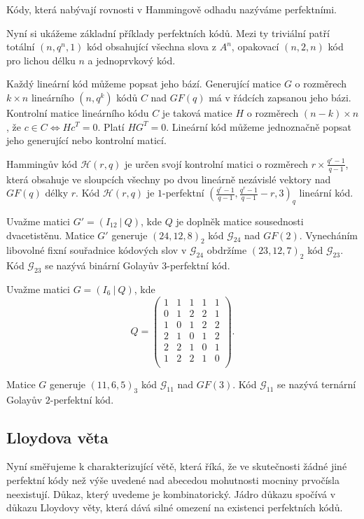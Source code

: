\df Kódy, která nabývají rovnosti v Hammingově odhadu nazýváme perfektními.

Nyní si ukážeme základní příklady perfektních kódů. Mezi ty triviální patří totální $(n, q^n, 1)$ kód obsahující všechna slova z $A^n$, opakovací $(n, 2, n )$ kód pro lichou délku $n$ a jednoprvkový kód. 

Každý lineární kód můžeme popsat jeho bází. Generující matice $G$ o rozměrech $k \times n$ lineárního $(n, q^k)$ kódů $C$ nad $GF(q)$ má v řádcích zapsanou jeho bázi. Kontrolní matice lineárního kódu $C$ je taková matice $H$ o rozměrech $(n-k) \times n$, že $c\in C \Leftrightarrow Hc^T=0$. Platí $HG^T=0$. Lineární kód můžeme jednoznačně popsat jeho generující nebo kontrolní maticí.

\df Hammingův kód $\mathcal{H}(r, q)$ je určen svojí kontrolní matici o rozměrech $r \times \frac{q^r-1}{q-1}$, která obsahuje ve sloupcích všechny po dvou lineárně nezávislé vektory nad $GF(q)$ délky $r$. Kód $\mathcal{H}(r, q)$ je $1$-perfektní $(\frac{q^r-1}{q-1}, \frac{q^r-1}{q-1}-r, 3)_q$ lineární kód.

\df Uvažme matici $G'=(I_{12}~|~Q)$, kde $Q$ je doplněk matice sousednosti dvacetistěnu. Matice $G'$ generuje $(24, 12, 8)_2$ kód $\mathcal{G}_{24}$ nad $GF(2)$. Vynecháním libovolné fixní souřadnice kódových slov v $\mathcal{G}_{24}$ obdržíme $(23, 12, 7)_2$ kód $\mathcal{G}_{23}$. Kód $\mathcal{G}_{23}$ se nazývá binární Golayův $3$-perfektní kód.

\df Uvažme matici $G=(I_6~|~Q)$, kde 
\begin{displaymath}
Q= \left(
\begin{array}{ccccc}
1& 1 & 1 & 1 &  1\\
0& 1 & 2 & 2 &  1\\
1& 0 & 1 & 2 &  2\\
2& 1 & 0 & 1 &  2\\
2& 2 & 1 & 0 &  1\\
1& 2 & 2 & 1 &  0\\
\end{array}
\right).
\end{displaymath}

Matice $G$ generuje $(11, 6, 5)_3$ kód $\mathcal{G}_{11}$ nad $GF(3)$. Kód $\mathcal{G}_{11}$ se nazývá ternární Golayův $2$-perfektní kód. 

\subsection{Lloydova věta}
Nyní směřujeme k charakterizující větě, která říká, že ve skutečnosti žádné jiné perfektní kódy než výše uvedené nad abecedou mohutnosti mocniny prvočísla neexistují. Důkaz, který uvedeme je kombinatorický. Jádro důkazu spočívá v důkazu Lloydovy věty, která dává silné omezení na existenci perfektních kódů. 



